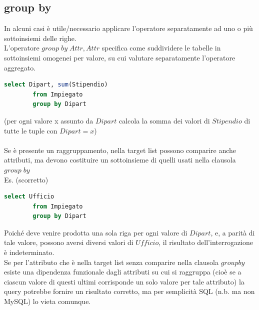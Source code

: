 \documentclass{article}
\begin{document}
	\subsection{group by}
	In alcuni casi è utile/necessario applicare l’operatore separatamente ad uno o più sottoinsiemi delle righe.\\
	L’operatore $group \; by \; Attr {, Attr}$ specifica come suddividere le tabelle in sottoinsiemi omogenei per valore, su cui valutare separatamente l’operatore aggregato.
	\begin{lstlisting}[language=SQL]
		select Dipart, sum(Stipendio)
		from Impiegato
		group by Dipart
	\end{lstlisting}
	(per ogni valore x assunto da $Dipart$ calcola la somma dei valori di $Stipendio$ di tutte le tuple con $Dipart=x$)\\\\
	Se è presente un raggruppamento, nella target list possono comparire anche attributi, ma devono costituire un sottoinsieme di quelli usati nella clausola $group \; by$\\
	Es. (scorretto) 
	\begin{lstlisting}[language=SQL]
		select Ufficio
		from Impiegato
		group by Dipart
	\end{lstlisting}
	Poiché deve venire prodotta una sola riga per ogni valore di $Dipart$, e, a parità di tale valore, possono aversi diversi valori di $Ufficio$, il risultato dell’interrogazione è indeterminato.\\
	Se per l’attributo che è nella target list senza comparire nella clausola $group by$ esiste una dipendenza funzionale dagli attributi su cui si raggruppa (cioè se a ciascun valore di questi ultimi corrisponde un solo valore per tale attributo) la query potrebbe fornire un risultato corretto, ma per semplicità SQL (n.b. ma non MySQL) lo vieta comunque.
\end{document}
